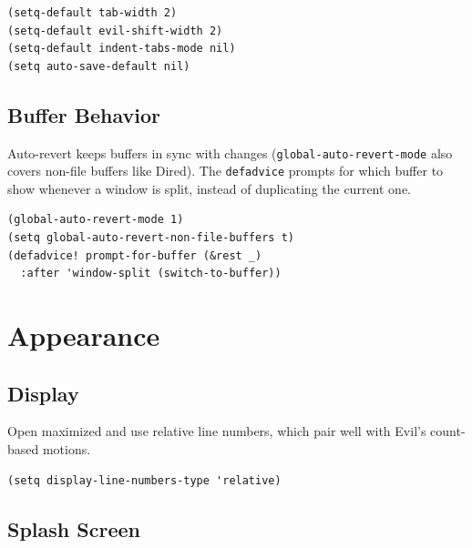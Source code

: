 \documentclass[11pt]{article}
\begin{document}
\begin{verbatim}
(setq-default tab-width 2)
(setq-default evil-shift-width 2)
(setq-default indent-tabs-mode nil)
(setq auto-save-default nil)
\end{verbatim}
\subsection{Buffer Behavior}
\label{sec:org03c48c7}
Auto-revert keeps buffers in sync with changes (\texttt{global-auto-revert-mode}
also covers non-file buffers like Dired). The \texttt{defadvice} prompts
for which buffer to show whenever a window is split, instead of
duplicating the current one.

\begin{verbatim}
(global-auto-revert-mode 1)
(setq global-auto-revert-non-file-buffers t)
(defadvice! prompt-for-buffer (&rest _)
  :after 'window-split (switch-to-buffer))
\end{verbatim}
\section{Appearance}
\label{sec:orgaa8754a}
\subsection{Display}
\label{sec:org9657e38}
Open maximized and use relative line numbers, which pair well with
Evil's count-based motions.

\begin{verbatim}
(setq display-line-numbers-type 'relative)
\end{verbatim}
\subsection{Splash Screen}
\label{sec:org55eddda}
\end{document}
